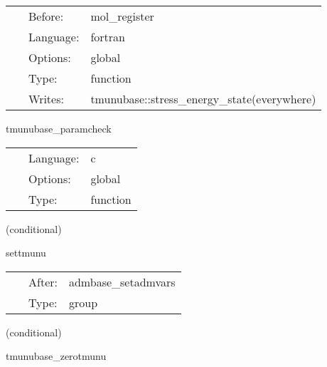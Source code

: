 \hspace{5mm}

 \begin{tabular*}{160mm}{cll} 
~ & Before:  & mol\_register \\ 
~ & Language:  & fortran \\ 
~ & Options:  & global \\ 
~ & Type:  & function \\ 
~ & Writes:  & tmunubase::stress\_energy\_state(everywhere) \\ 
\end{tabular*} 


\vspace{5mm}


\hspace{5mm} tmunubase\_paramcheck 

\hspace{5mm}{\it check that no deprecated parameters are used. } 


\hspace{5mm}

 \begin{tabular*}{160mm}{cll} 
~ & Language:  & c \\ 
~ & Options:  & global \\ 
~ & Type:  & function \\ 
\end{tabular*} 


\vspace{5mm}

   (conditional) 

\hspace{5mm} settmunu 

\hspace{5mm}{\it group for calculating the stress-energy tensor } 


\hspace{5mm}

 \begin{tabular*}{160mm}{cll} 
~ & After:  & admbase\_setadmvars \\ 
~ & Type:  & group \\ 
\end{tabular*} 


\vspace{5mm}

   (conditional) 

\hspace{5mm} tmunubase\_zerotmunu 

